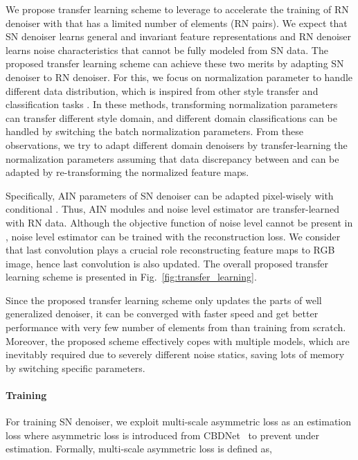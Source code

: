 \documentclass[10pt,twocolumn,letterpaper]{article}
\begin{document}
We propose transfer learning scheme to leverage  to accelerate the training of RN denoiser with  that has a limited number of elements (RN pairs). 
We expect that SN denoiser learns general and invariant feature representations  
and RN denoiser learns noise characteristics that cannot be fully modeled from SN data.
The proposed transfer learning scheme can achieve these two merits by adapting SN denoiser to RN denoiser.
For this, we focus on normalization parameter to handle different data distribution, which is inspired from other style transfer and classification tasks \cite{ulyanov2016instance,huang2017arbitrary, park2019semantic}. In these methods, transforming normalization parameters can transfer different style domain, and different domain classifications can be handled by switching the batch normalization parameters.
From these observations, we try to adapt different domain denoisers by transfer-learning the normalization parameters assuming that data discrepancy between   and  can be adapted by re-transforming the normalized feature maps.

Specifically, AIN parameters of SN denoiser can be adapted pixel-wisely with conditional .
Thus, AIN modules and noise level estimator are transfer-learned with RN data.
Although the objective function of noise level cannot be present in , noise level estimator can be trained with the reconstruction loss.
We consider that last convolution plays a crucial role reconstructing feature maps to RGB image, hence last convolution is also updated. 
The overall proposed transfer learning scheme is presented in Fig.~\ref{fig:transfer_learning}.

Since the proposed transfer learning scheme only updates the parts of well generalized denoiser, it can be converged with faster speed and get better performance with very few number of elements from  than training from scratch. 
Moreover, the proposed scheme effectively copes with multiple models, which are inevitably required due to severely different noise statics, saving lots of memory by switching specific parameters.



\paragraph{Training}
For training SN denoiser, we exploit multi-scale asymmetric loss as an estimation loss where asymmetric loss is introduced from CBDNet~\cite{guo2019toward} to prevent under estimation.
Formally, multi-scale asymmetric loss is defined as,
\end{document}
